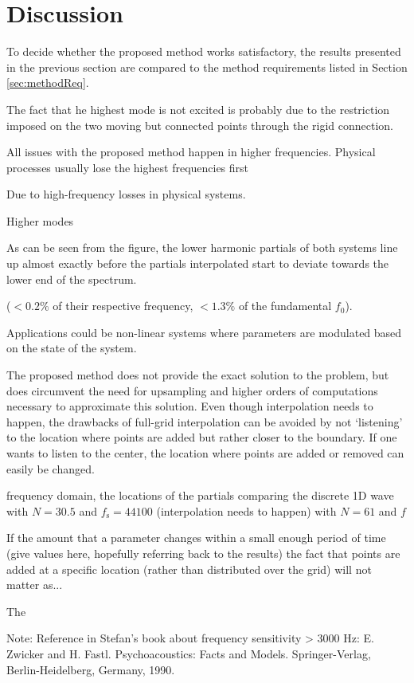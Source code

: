 \section{Discussion}
To decide whether the proposed method works satisfactory, the results presented in the previous section are compared to the method requirements listed in Section \eqref{sec:methodReq}. 

The fact that he highest mode is not excited is probably due to the restriction imposed on the two moving but connected points through the rigid connection.


All issues with the proposed method happen in higher frequencies. Physical processes usually lose the highest frequencies first

Due to high-frequency losses in physical systems. 

Higher modes

As can be seen from the figure, the lower harmonic partials of both systems line up almost exactly before the partials interpolated start to deviate towards the lower end of the spectrum.

($<0.2\%$ of their respective frequency, $<1.3\%$ of the fundamental $f_0$). 


Applications could be non-linear systems where parameters are modulated based on the state of the system. 

The proposed method does not provide the exact solution to the problem, but does circumvent the need for upsampling and higher orders of computations necessary to approximate this solution. Even though interpolation needs to happen, the drawbacks of full-grid interpolation can be avoided by not `listening' to the location where points are added but rather closer to the boundary. If one wants to listen to the center, the location where points are added or removed can easily be changed.


frequency domain, the locations of the partials comparing the discrete 1D wave with $N = 30.5$ and $f_\text{s} = 44100$ (interpolation needs to happen) with $N = 61$ and $f$ 

If the amount that a parameter changes within a small enough period of time (give values here, hopefully referring back to the results) the fact that points are added at a specific location (rather than distributed over the grid) will not matter as... 

The 


Note: Reference in Stefan's book about frequency sensitivity > 3000 Hz: E. Zwicker and H. Fastl. Psychoacoustics: Facts and Models. Springer-Verlag, Berlin-Heidelberg,
Germany, 1990.
